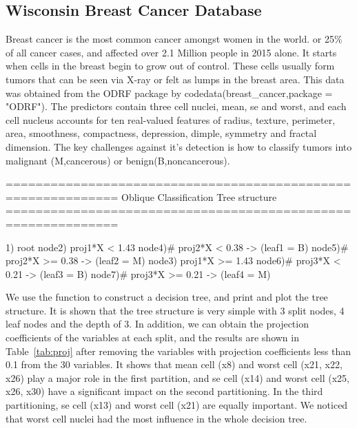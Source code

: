 \documentclass[nojss]{jss}
\newcommand{\fct}[1]{\code{#1()}}
\numberwithin{equation}{section}
\begin{document}
\subsection{Wisconsin Breast Cancer Database}
Breast cancer is the most common cancer amongst women in the world. or 25\% of all cancer cases, and affected over 2.1 Million people in 2015 alone. It starts when cells in the breast begin to grow out of control. These cells usually form tumors that can be seen via X-ray or felt as lumps in the breast area. This data was obtained from the ODRF package by code{data(breast\_cancer,package = "ODRF")}. The predictors contain three cell nuclei, mean, se and worst, and each cell nucleus accounts for ten real-valued features of radius, texture, perimeter, area, smoothness, compactness, depression, dimple, symmetry and fractal dimension. The key challenges against it's detection is how to classify tumors into malignant (M,cancerous) or benign(B,noncancerous).
\begin{Schunk}
\begin{Soutput}
============================================================= 
Oblique Classification Tree structure 
=============================================================

1) root
   node2)  proj1*X < 1.43
      node4)# proj2*X < 0.38 -> (leaf1 = B)
      node5)# proj2*X >= 0.38 -> (leaf2 = M)
   node3)  proj1*X >= 1.43
      node6)# proj3*X < 0.21 -> (leaf3 = B)
      node7)# proj3*X >= 0.21 -> (leaf4 = M)
\end{Soutput}
\end{Schunk}
We use the function \fct{ODT} to construct a decision tree, and print and plot the tree structure. It is shown that the tree structure is very simple with 3 split nodes, 4 leaf nodes and the depth of 3. In addition, we can obtain the projection coefficients of the variables at each split, and the results are shown in Table~\ref{tab:proj} after removing the variables with projection coefficients less than 0.1 from the 30 variables. It shows that mean cell (x8) and worst cell (x21, x22, x26) play a major role in the first partition, and se cell (x14) and worst cell (x25, x26, x30) have a significant impact on the second partitioning. In the third partitioning, se cell (x13) and worst cell (x21) are equally important. We noticed that worst cell nuclei had the most influence in the whole decision tree.
\end{document}
